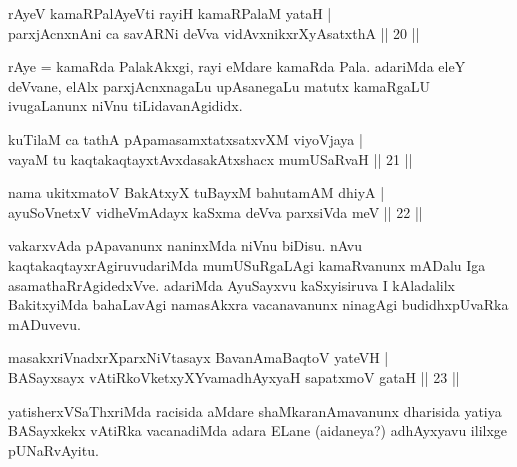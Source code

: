 \begin{shl}
rAyeV kamaRPalAyeVti rayiH kamaRPalaM yataH | \\
parxjAcnxnAni ca savARNi deVva vidAvxnikxrXyAsatxthA \hfill||  20 ||
\end{shl}

\begin{artha} 
rAye = kamaRda PalakAkxgi, rayi eMdare kamaRda Pala. adariMda eleY 
deVvane, elAlx parxjAcnxnagaLu upAsanegaLu matutx kamaRgaLU 
ivugaLanunx niVnu tiLidavanAgididx.
\end{artha}

\begin{shl}
kuTilaM ca tathA pApamasamxtatxsatxvXM viyoVjaya | \\
vayaM tu kaqtakaqtayxtAvxdasakAtxshacx mumUSaRvaH \hfill||  21 || 
\end{shl}

\begin{shl}
nama ukitxmatoV BakAtxyX tuBayxM bahutamAM dhiyA | \\
ayuSoV\s netxV vidheVmAdayx kaSxma deVva parxsiVda meV \hfill||  22 || 
\end{shl}

\begin{artha} 
vakarxvAda pApavanunx naninxMda niVnu biDisu. nAvu 
kaqtakaqtayxrAgiruvudariMda mumUSuRgaLAgi kamaRvanunx mADalu Iga 
asamathaRrAgidedxVve. adariMda AyuSayxvu kaSxyisiruva I kAladalilx 
BakitxyiMda bahaLavAgi namasAkxra vacanavanunx ninagAgi budidhxpUvaRka 
mADuvevu.
\end{artha}


\begin{shl}
masakxriVnadxrXparxNiVtasayx BavanAmaBaqtoV yateVH | \\
BASayxsayx vAtiRkoVketxyXYvamadhAyxyaH sapatxmoV gataH \hfill||  23 || 
\end{shl}

\begin{artha} 
yatisherxVSaThxriMda racisida aMdare shaMkaranAmavanunx 
dharisida yatiya BASayxkekx vAtiRka vacanadiMda adara ELane (aidaneya?) adhAyxyavu 
ililxge pUNaRvAyitu.
\end{artha}

\centerline{}
